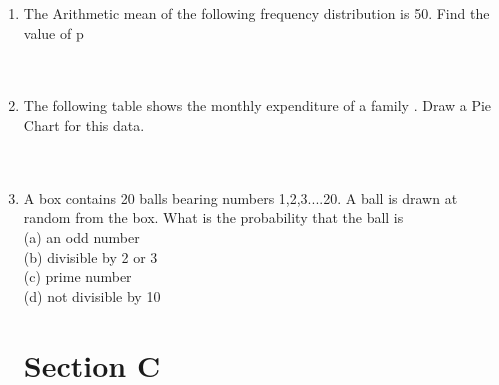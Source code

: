 \documentclass[journal,12pt,twocolumn]{IEEEtran}
\begin{document}
\begin{enumerate}[label=1.\arabic*]
\begin{enumerate}[label=2.\arabic*]
\item The Arithmetic mean of the following frequency distribution is 50. Find the value of p\\
\vspace{1mm}\\
\vspace{1mm}\\
\item The following table shows the monthly expenditure of a family
. Draw a Pie Chart for this data.\\
\vspace{2mm}\\
\vspace{2mm}\\
\item A box contains 20 balls bearing numbers 1,2,3....20. A ball is drawn at random from the box. What is the probability that the ball is\\

(a) an odd number\\
(b) divisible by 2 or 3 \\
(c) prime number\\
(d) not divisible by 10\\

\section{Section C}
\begin{enumerate}[label=3.\arabic*]


\end{enumerate}
\end{enumerate}
\end{enumerate}
\end{document}
